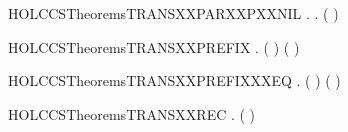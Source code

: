 \newcommand{\HOLCCSTheoremsTRANSXXPARXXNOXXSYNCR}{\UseVerbatim{HOLCCSTheoremsTRANSXXPARXXNOXXSYNCR}}
\begin{SaveVerbatim}{HOLCCSTheoremsTRANSXXPARXXPXXNIL}
\HOLTokenTurnstile{} \HOLSymConst{\HOLTokenForall{}}  .  \HOLSymConst{\ensuremath{\parallel}}  \HOLTokenTransBegin{}\HOLTokenTransEnd {} \HOLSymConst{\HOLTokenImp{}} \HOLSymConst{\HOLTokenExists{}}.  \HOLTokenTransBegin{}\HOLTokenTransEnd {} \HOLSymConst{\HOLTokenConj{}} ( \HOLSymConst{=}  \HOLSymConst{\ensuremath{\parallel}} )
\end{SaveVerbatim}
\newcommand{\HOLCCSTheoremsTRANSXXPARXXPXXNIL}{\UseVerbatim{HOLCCSTheoremsTRANSXXPARXXPXXNIL}}
\begin{SaveVerbatim}{HOLCCSTheoremsTRANSXXPREFIX}
\HOLTokenTurnstile{} \HOLSymConst{\HOLTokenForall{}}   .  \HOLTokenTransBegin{}\HOLTokenTransEnd {} \HOLSymConst{\HOLTokenImp{}} ( \HOLSymConst{=} ) \HOLSymConst{\HOLTokenConj{}} ( \HOLSymConst{=} )
\end{SaveVerbatim}
\newcommand{\HOLCCSTheoremsTRANSXXPREFIX}{\UseVerbatim{HOLCCSTheoremsTRANSXXPREFIX}}
\begin{SaveVerbatim}{HOLCCSTheoremsTRANSXXPREFIXXXEQ}
\HOLTokenTurnstile{} \HOLSymConst{\HOLTokenForall{}}   .  \HOLTokenTransBegin{}\HOLTokenTransEnd {} \HOLSymConst{\HOLTokenEquiv{}} ( \HOLSymConst{=} ) \HOLSymConst{\HOLTokenConj{}} ( \HOLSymConst{=} )
\end{SaveVerbatim}
\newcommand{\HOLCCSTheoremsTRANSXXPREFIXXXEQ}{\UseVerbatim{HOLCCSTheoremsTRANSXXPREFIXXXEQ}}
\begin{SaveVerbatim}{HOLCCSTheoremsTRANSXXREC}
\HOLTokenTurnstile{} \HOLSymConst{\HOLTokenForall{}}   .    \HOLTokenTransBegin{}\HOLTokenTransEnd {} \HOLSymConst{\HOLTokenImp{}}   (  )  \HOLTokenTransBegin{}\HOLTokenTransEnd {}
\end{SaveVerbatim}
